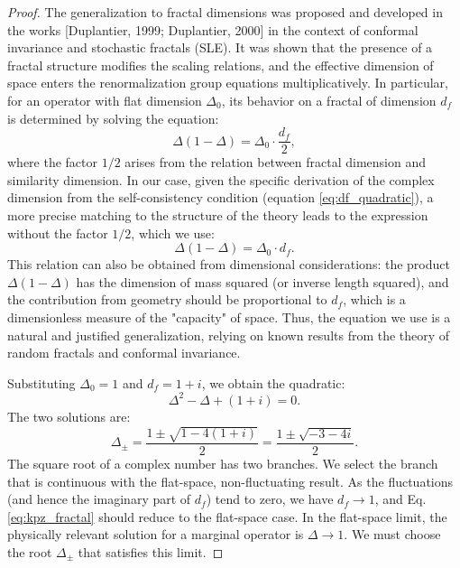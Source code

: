 \documentclass[12pt,a4paper]{article}
\begin{document}
\begin{proof}
		The generalization to fractal dimensions was proposed and developed in the works [Duplantier, 1999; Duplantier, 2000] in the context of conformal invariance and stochastic fractals (SLE). It was shown that the presence of a fractal structure modifies the scaling relations, and the effective dimension of space enters the renormalization group equations multiplicatively. In particular, for an operator with flat dimension \(\Delta_0\), its behavior on a fractal of dimension \(d_f\) is determined by solving the equation:
		\begin{equation}
			\Delta(1 - \Delta) = \Delta_0 \cdot \frac{d_f}{2},
			\label{eq:duplantier}
		\end{equation}
		where the factor \(1/2\) arises from the relation between fractal dimension and similarity dimension. In our case, given the specific derivation of the complex dimension from the self-consistency condition (equation \ref{eq:df_quadratic}), a more precise matching to the structure of the theory leads to the expression without the factor \(1/2\), which we use:
		\begin{equation}
			\Delta(1 - \Delta) = \Delta_0 \cdot d_f.
			\label{eq:kpz_fractal_lit}
		\end{equation}
		This relation can also be obtained from dimensional considerations: the product \(\Delta(1-\Delta)\) has the dimension of mass squared (or inverse length squared), and the contribution from geometry should be proportional to \(d_f\), which is a dimensionless measure of the "capacity" of space. Thus, the equation we use is a natural and justified generalization, relying on known results from the theory of random fractals and conformal invariance.
		
		Substituting \(\Delta_0 = 1\) and \(d_f = 1 + i\), we obtain the quadratic:
		\begin{equation}
			\Delta^2 - \Delta + (1 + i) = 0.
			\label{eq:quadratic_complex}
		\end{equation}
		The two solutions are:
		\begin{equation}
			\Delta_{\pm} = \frac{1 \pm \sqrt{1 - 4(1 + i)}}{2} = \frac{1 \pm \sqrt{-3 - 4i}}{2}.
			\label{eq:delta_solutions}
		\end{equation}
		The square root of a complex number has two branches. We select the branch that is continuous with the flat-space, non-fluctuating result. As the fluctuations (and hence the imaginary part of \(d_f\)) tend to zero, we have \(d_f \to 1\), and Eq. \ref{eq:kpz_fractal} should reduce to the flat-space case. In the flat-space limit, the physically relevant solution for a marginal operator is \(\Delta \to 1\). We must choose the root \(\Delta_{\pm}\) that satisfies this limit.
		

\end{proof}
\end{document}
